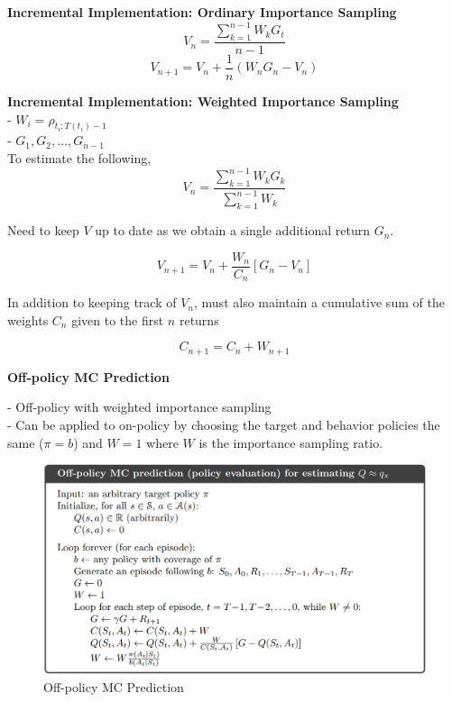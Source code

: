 \documentclass{article}
\begin{document}
\noindent
\textbf{Incremental Implementation: Ordinary Importance Sampling}
\begin{equation}
V_{n}=\frac{\sum_{k=1}^{n-1} W_{k} G_{t}}{n-1}
\end{equation}
\begin{equation}
V_{n+1}=V_{n}+\frac{1}{n}\left(W_{n} G_{n}-V_{n}\right)
\end{equation}

\noindent
\textbf{Incremental Implementation: Weighted Importance Sampling}\\
- $W_{i}=\rho_{t_{i}: T\left(t_{i}\right)-1}$\\
- $G_{1}, G_{2}, \dots, G_{n-1}$\\

\noindent
To estimate the following, 
\begin{equation}
V_{n}=\frac{\sum_{k=1}^{n-1} W_{k} G_{k}}{\sum_{k=1}^{n-1} W_{k}}
\end{equation}

\noindent
Need to keep $V$ up to date as we obtain a single additional return $G_{n}$.

\begin{equation}
V_{n+1}=V_{n}+\frac{W_{n}}{C_{n}}\left[G_{n}-V_{n}\right]
\end{equation}

\noindent
In addition to keeping track of $V_{n}$, must also maintain a cumulative sum of
the weights $C_{n}$ given to the first $n$ returns

\begin{equation}
C_{n+1}=C_{n}+W_{n+1}
\end{equation}

\newpage
\noindent
\textbf{Off-policy MC Prediction}

\noindent
- Off-policy with weighted importance sampling\\ 
- Can be applied to on-policy by choosing the target and behavior policies the
same ($\pi = b$) and $W = 1$ where $W$ is the importance sampling ratio.

\begin{figure}[h]
\includegraphics[scale=0.25]{offpolicy_mc_prediction}
\centering
\caption{Off-policy MC Prediction}
\end{figure}
\end{document}
